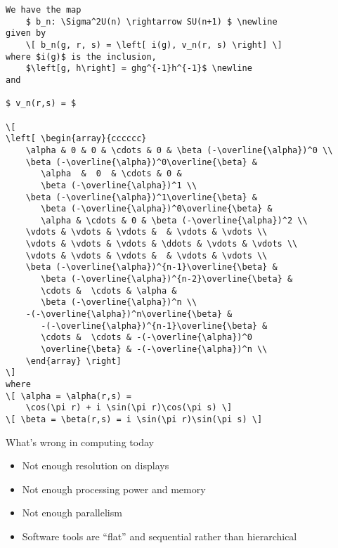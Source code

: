 \documentclass{slides}
\begin{document}
\begin{slide}{}
{\tiny
\begin{verbatim}
We have the map
	$ b_n: \Sigma^2U(n) \rightarrow SU(n+1) $ \newline
given by
	\[ b_n(g, r, s) = \left[ i(g), v_n(r, s) \right] \]
where $i(g)$ is the inclusion,
	$\left[g, h\right] = ghg^{-1}h^{-1}$ \newline
and

$ v_n(r,s) = $

\[
\left[ \begin{array}{cccccc}
	\alpha & 0 & 0 & \cdots & 0 & \beta (-\overline{\alpha})^0 \\
	\beta (-\overline{\alpha})^0\overline{\beta} &
	   \alpha  &  0  & \cdots & 0 &
	   \beta (-\overline{\alpha})^1 \\
	\beta (-\overline{\alpha})^1\overline{\beta} &
	   \beta (-\overline{\alpha})^0\overline{\beta} &
	   \alpha & \cdots & 0 & \beta (-\overline{\alpha})^2 \\
	\vdots & \vdots & \vdots &  & \vdots & \vdots \\
	\vdots & \vdots & \vdots & \ddots & \vdots & \vdots \\
	\vdots & \vdots & \vdots &  & \vdots & \vdots \\
	\beta (-\overline{\alpha})^{n-1}\overline{\beta} &
	   \beta (-\overline{\alpha})^{n-2}\overline{\beta} &
	   \cdots &  \cdots & \alpha &
	   \beta (-\overline{\alpha})^n \\
	-(-\overline{\alpha})^n\overline{\beta} &
	   -(-\overline{\alpha})^{n-1}\overline{\beta} &
	   \cdots &  \cdots & -(-\overline{\alpha})^0 
	   \overline{\beta} & -(-\overline{\alpha})^n \\
	\end{array} \right]
\]
where
\[ \alpha = \alpha(r,s) =
	\cos(\pi r) + i \sin(\pi r)\cos(\pi s) \]
\[ \beta = \beta(r,s) = i \sin(\pi r)\sin(\pi s) \]

\end{verbatim}
}
\end{slide}

\begin{slide}{}

{\large What's wrong in computing today }

\begin{itemize}
	\item Not enough resolution on displays
	\item Not enough processing power and memory
	\item Not enough parallelism
	\item Software tools are ``flat'' and sequential \newline
		rather than hierarchical
\end{itemize}

\end{slide}
\end{document}
